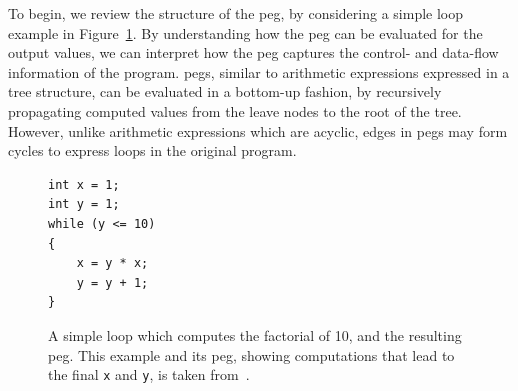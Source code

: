 To begin, we review the structure of the \gls{peg}, by considering a simple
loop example in Figure~\ref{bg:fig:factorial}.  By understanding how the
\gls{peg} can be evaluated for the output values, we can interpret how the
\gls{peg} captures the control- and data-flow information of the program.
\glspl{peg}, similar to arithmetic expressions expressed in a tree structure,
can be evaluated in a bottom-up fashion, by recursively propagating computed
values from the leave nodes to the root of the tree.  However, unlike
arithmetic expressions which are acyclic, edges in \glspl{peg} may form cycles
to express loops in the original program.
\begin{figure}[ht]
    \newsavebox{\factlstbox}
    \begin{lrbox}{\factlstbox}
    \begin{lstlisting}
int x = 1;
int y = 1;
while (y <= 10)
{
    x = y * x;
    y = y + 1;
}
    \end{lstlisting}
    \end{lrbox}
    \centering
    \caption{%
        A simple loop which computes the factorial of 10, and the resulting
        \gls{peg}\@.  This example and its \gls{peg}, showing computations
        that lead to the final \texttt{x} and \texttt{y}, is taken
        from~\cite{tate09}.
    }\label{bg:fig:factorial}
\end{figure}

